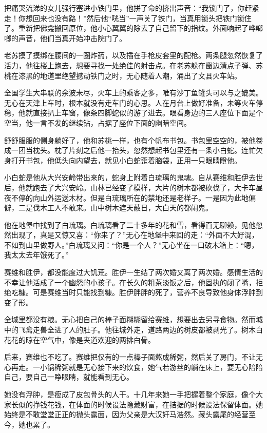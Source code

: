把痛哭流涕的女儿强行塞进小铁门里，他拼了命的挤出声音：``我锁门了，你赶紧走！你想回来也没有路！''然后他``咣当''一声关了铁门，当真用锁头把铁门锁住了。重新把佛龛搬回原位，他小心翼翼的除去了自己留下的指纹。外面响起了哗啷啷的声音，他们当真开始冲击院门了。

老苏摸了摸绑在腰间的一圈炸药，以及插在手枪皮套里的配枪。两条腿忽然恢复了活力，他往楼上跑去，想要寻找一处绝佳的射击点。在老苏躲在窗边清点子弹、苏桃在漆黑的地道里绝望撼动铁门之时，无心随着人潮，涌出了文县火车站。

全国学生大串联的余波未尽，火车上的乘客之多，唯有沙丁鱼罐头可以与之媲美。无心在天津上车时，根本就没有走车门的心思。人在月台上做好准备，未等火车停稳，他就直接扒上车窗，像条四脚蛇似的游了进去。眼看身边的三人座位下面是个空当，他一言不发的继续钻，占据了座位下面的幽暗空间。

舒舒服服的侧身躺好了，他和苏桃一样，也有个帆布书包。书包里空空的，被他卷成一团当枕头。枕了片刻之后他一抬头，忽然想起书包里还有一条小白蛇。连忙欠身打开书包，他低头向内望去，就见小白蛇歪着脑袋，正用一只眼睛瞪他。

小白蛇是他从大兴安岭带出来的，蛇身上附着白琉璃的鬼魂。自从赛维和胜伊去世后，他就跑去了大兴安岭。山林已经变了模样，大片的树木都被砍伐了，大卡车昼夜不停的向山外运送木材。但是白琉璃所在的禁地还是老样子。一是因为此地偏僻，二是伐木工人不敢来。山中树木遮天蔽日，大白天的都闹鬼。

他在地堡中找到了白琉璃。白琉璃看了二十多年的花和雪，看得百无聊赖，见他忽然出现了，真是又惊又喜：``你来了？''无心在地堡中来回的走：``外面不大好混，不如到山里做野人。''白琉璃又问：``你是一个人？''无心坐在一口破木箱上：``嗯，我太太去年饿死了。''

赛维和胜伊，都没能度过大饥荒。胜伊一生结了两次婚又离了两次婚。感情生活的不幸让他活成了一个幽怨的小孩子。在长久的粗茶淡饭之后，他固执的闭了嘴，拒绝吃糠。可是赛维当时只能找到糠。胜伊胖胖的死了，营养不良导致他身体浮肿到变了形。

全城里都没有粮。无心把自己的棒子面糊糊留给赛维，想要出去另寻食物。然而城中的飞禽走兽全进了人的肚子。他往城外走，道路两边的树皮都被剥光了。树木白花花的晾在空气中，像是夹道欢迎的两排白骨。

后来，赛维也不吃了。赛维把仅有的一点棒子面熬成稀粥，然后关了房门，不让无心再走。一小锅稀粥就是无心接下来的饮食，她气若游丝的躺在床上，要无心陪陪自己，要自己一睁眼睛，就能看到无心。

她没有浮肿，是瘦成了皮包骨头的人干。十几年来她一手把握着整个家庭，像个大家长似的挣钱花钱，在体面的时候设法隐藏财富，在拮据的时候设法保留体面。她始终是不敢堂堂正正的抛头露面，因为父亲是大汉奸马浩然。藏头露尾的经营至今，她也累了。

